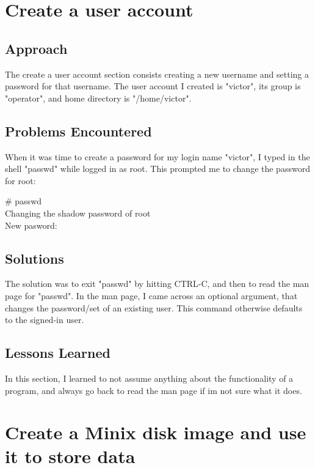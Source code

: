 \documentclass[11pt]{article}
\begin{document}
\setcounter{section}{2} %
\section{Create a user account}


\subsection{Approach}

  The create a user account section consists creating a new 
username and setting a password for that username. 
The user account I created is "victor", its group is "operator", 
and home directory is "/home/victor".

\subsection{Problems Encountered}

  When it was time to create a password for my login name "victor", 
I typed in the shell "passwd" while logged in as root. This prompted 
me to change the password for root:

{\tt\begin{tabbing}
\# passwd\\
Changing the shadow password of root\\
New pasword:\\
\end{tabbing}}

\subsection{Solutions}

   The solution was to exit "passwd" by hitting CTRL-C, 
and then to read the man page for "passwd". In the man page, I came across
an optional argument, that changes the password/set of an existing user. This command
otherwise defaults to the signed-in user.

\subsection{Lessons Learned}
  In this section, I learned to not assume anything about the functionality of a program, 
and always go back to read the man page if im not sure what it does.


\setcounter{section}{3} %
\section{Create a Minix disk image and use it to store data}
\end{document}
